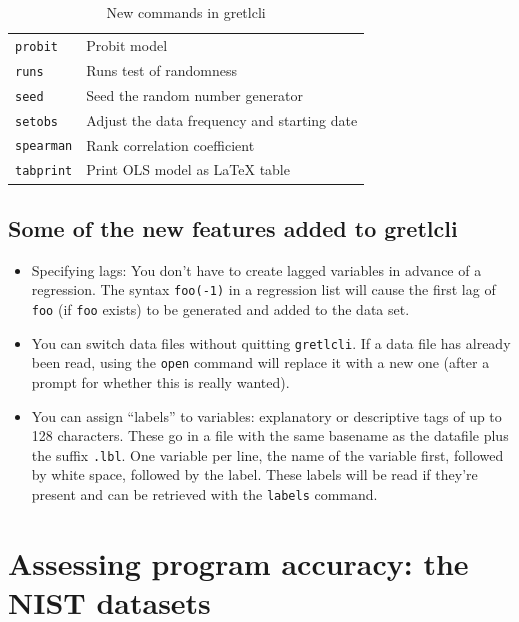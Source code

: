 \documentclass{article}
\begin{document}
\begin{table}[htbp]
\begin{center}
\begin{tabular}{ll}
\texttt{probit} &         Probit model\\
\texttt{runs} &           Runs test of randomness\\
\texttt{seed} &           Seed the random number generator\\
\texttt{setobs} &         Adjust the data frequency and starting date\\
\texttt{spearman} &       Rank correlation coefficient\\
\texttt{tabprint} &       Print OLS model as \LaTeX{} table\\
\end{tabular}
\caption{New commands in \textsf{gretlcli}}
\label{cmdtab}
\end{center}
\end{table}

\subsection{Some of the new features added to gretlcli}

\begin{itemize}
  
\item Specifying lags: You don't have to create lagged variables in
  advance of a regression.  The syntax \texttt{foo(-1)} in a
  regression list will cause the first lag of \texttt{foo} (if
  \texttt{foo} exists) to be generated and added to the data set.

\item You can switch data files without quitting \texttt{gretlcli}.
  If a data file has already been read, using the \texttt{open}
  command will replace it with a new one (after a prompt for whether
  this is really wanted).
  
\item You can assign ``labels'' to variables: explanatory or
  descriptive tags of up to 128 characters.  These go in a file with
  the same basename as the datafile plus the suffix \texttt{.lbl}.
  One variable per line, the name of the variable first, followed by
  white space, followed by the label.  These labels will be read if
  they're present and can be retrieved with the \texttt{labels}
  command.
  
\end{itemize}

\clearpage

\section{Assessing program accuracy: the NIST datasets}
\label{nist}
\end{document}
